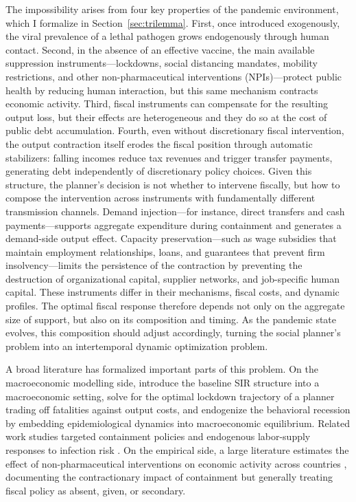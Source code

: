 \documentclass[12pt, a4paper]{article}
\begin{document}
The impossibility arises from four key properties of the pandemic environment, which I formalize in Section~\ref{sec:trilemma}. First, once introduced exogenously, the viral prevalence of a lethal pathogen grows endogenously through human contact. Second, in the absence of an effective vaccine, the main available suppression instruments---lockdowns, social distancing mandates, mobility restrictions, and other non-pharmaceutical interventions (NPIs)---protect public health by reducing human interaction, but this same mechanism contracts economic activity. Third, fiscal instruments can compensate for the resulting output loss, but their effects are heterogeneous and they do so at the cost of public debt accumulation. Fourth, even without discretionary fiscal intervention, the output contraction itself erodes the fiscal position through automatic stabilizers: falling incomes reduce tax revenues and trigger transfer payments, generating debt independently of discretionary policy choices. Given this structure, the planner's decision is not whether to intervene fiscally, but how to compose the intervention across instruments with fundamentally different transmission channels. Demand injection---for instance, direct transfers and cash payments---supports aggregate expenditure during containment and generates a demand-side output effect. Capacity preservation---such as wage subsidies that maintain employment relationships, loans, and guarantees that prevent firm insolvency---limits the persistence of the contraction by preventing the destruction of organizational capital, supplier networks, and job-specific human capital. These instruments differ in their mechanisms, fiscal costs, and dynamic profiles. The optimal fiscal response therefore depends not only on the aggregate size of support, but also on its composition and timing. As the pandemic state evolves, this composition should adjust accordingly, turning the social planner's problem into an intertemporal dynamic optimization problem.

A broad literature has formalized important parts of this problem. On the macroeconomic modelling side, \citet{Atkeson2020} introduce the baseline SIR structure into a macroeconomic setting, \citet{alvarez2020} solve for the optimal lockdown trajectory of a planner trading off fatalities against output costs, and \citet{eichenbaum2021macro} endogenize the behavioral recession by embedding epidemiological dynamics into macroeconomic equilibrium. Related work studies targeted containment policies \citep{acemoglu2021} and endogenous labor-supply responses to infection risk \citep{Jones2021}. On the empirical side, a large literature estimates the effect of non-pharmaceutical interventions on economic activity across countries \citep{Ashraf2022, Konig2020, Cross2020, Gordon2021}, documenting the contractionary impact of containment but generally treating fiscal policy as absent, given, or secondary.
\end{document}
